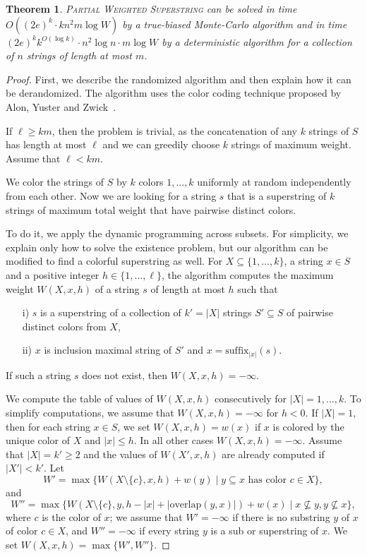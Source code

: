 \documentclass[11pt]{article}
\newtheorem{theorem}{Theorem}
\newcommand{\suffix}{\textrm{suffix}}
\newcommand{\overlap}{\textrm{overlap}}
\begin{document}
\begin{theorem}\label{thm:FPT-weight}
\textsc{Partial Weighted Superstring} can be solved  
in time $O((2e)^{k}\cdot kn^2m\log W)$ by  a true-biased Monte-Carlo algorithm
and in time $(2e)^{k}k^{O(\log k)}\cdot n^2\log n\cdot m\log W$ by a deterministic algorithm for a collection of $n$ strings of length at most $m$.
\end{theorem}

\begin{proof}
First, we describe the randomized algorithm and then explain how it can be derandomized. The algorithm uses the color coding technique proposed by Alon, Yuster and Zwick~\cite{AlonYZ95}. 

If $\ell\geq km$, then the problem is trivial, as the concatenation of any $k$ strings of $S$ has length at most $\ell$ and we can greedily choose $k$ strings of maximum weight. Assume that $\ell< km.$

We color the strings of $S$ by $k$ colors $1,\ldots,k$ uniformly at random independently from each other.
Now we are looking for a string $s$ that is a superstring of $k$ strings of maximum total weight that have pairwise distinct colors. 


To do it, we apply the dynamic programming across subsets. 
For simplicity, we explain only how to solve the existence problem, but our algorithm can be modified to find a colorful superstring as well.
For $X\subseteq \{1,\ldots,k\}$, a string $x\in S$ and a positive integer $h\in\{1,\ldots,\ell\}$,
the algorithm computes the maximum weight $W(X,x,h)$ of a string $s$ of length at most $h$ such that
\begin{itemize}
\item[i)] $s$ is a superstring of a collection of $k'=|X|$ strings $S'\subseteq S$ of pairwise distinct colors from $X$, 
\item[ii)] $x$ is inclusion maximal string of $S'$ and $x=\suffix_{|x|}(s)$. 
\end{itemize}
If such a string $s$ does not exist, then $W(X,x,h)=-\infty$.

We compute the table of values of $W(X,x,h)$ consecutively for $|X|=1,\ldots,k$. To simplify computations, we assume that $W(X,x,h)=-\infty$ for $h< 0$.
If $|X|=1$, then for each string $x\in S$, we set $W(X,x,h)=w(x)$ if $x$ is colored by the unique color of $X$ and $|x|\leq h$. In all other cases $W(X,x,h)=-\infty$.
Assume that $|X|=k'\geq 2$ and the values of $W(X',x,h)$ are already computed if $|X'|<k'$. 
Let
$$W'=\max\{W(X\setminus\{c\},x,h)+w(y)\mid y\subseteq x\text{ has  color }c\in X\},$$
and
$$W''=\max\{W(X\setminus \{c\},y,h-|x|+|\overlap(y,x)|)+w(x)\mid x\not\subseteq y,y\not\subseteq x\},$$
where $c$ is the color of $x$; we assume that $W'=-\infty$ if there is no substring $y$ of $x$ of color $c\in X$, and 
$W''=-\infty$  if every string $y$ is a sub or superstring of $x$. 
We set $W(X,x,h)=\max\{W',W''\}$.


\end{proof}
\end{document}
